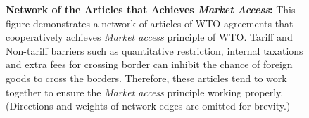 \begin{figure}
    \centering{
        
    }
    \caption{{\bf Network of the Articles that Achieves \textit{Market Access}:}
        This figure demonstrates a network of articles of WTO agreements
        that cooperatively achieves \textit{Market access} principle of WTO.
        Tariff and Non-tariff barriers such as quantitative restriction, internal taxations
        and extra fees for crossing border can inhibit the chance of foreign goods to cross the borders.
        Therefore, these articles tend to work together to ensure the \textit{Market access} principle working properly.
        (Directions and weights of network edges are omitted for brevity.)
    }
    \label{fig:market-aceess_directed}
\end{figure}









